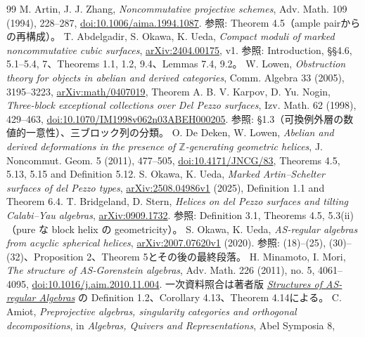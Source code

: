 \documentclass[11pt,a4paper]{ltjsarticle}
\theoremstyle{definition}\newtheorem{remark}[theorem]{注意}
\begin{document}
\begin{thebibliography}{99}
 M. Artin, J. J. Zhang,
\emph{Noncommutative projective schemes},
Adv. Math. 109 (1994), 228--287,
\href{https://doi.org/10.1006/aima.1994.1087}{doi:10.1006/aima.1994.1087}.
参照: Theorem 4.5（ample pairからの再構成）。
 T. Abdelgadir, S. Okawa, K. Ueda,
\emph{Compact moduli of marked noncommutative cubic surfaces},
\href{https://arxiv.org/abs/2404.00175}{arXiv:2404.00175}, v1.
参照: Introduction, \S\S4.6, 5.1--5.4, 7、Theorems 1.1, 1.2, 9.4、Lemmas 7.4, 9.2。
 W. Lowen,
\emph{Obstruction theory for objects in abelian and derived categories},
Comm. Algebra 33 (2005), 3195--3223,
\href{https://arxiv.org/abs/math/0407019}{arXiv:math/0407019}, Theorem A.
 B. V. Karpov, D. Yu. Nogin,
\emph{Three-block exceptional collections over Del Pezzo surfaces},
Izv. Math. 62 (1998), 429--463,
\href{https://doi.org/10.1070/IM1998v062n03ABEH000205}{doi:10.1070/IM1998v062n03ABEH000205}.
参照: \S1.3（可換例外層の数値的一意性）、三ブロック列の分類。
 O. De Deken, W. Lowen,
\emph{Abelian and derived deformations in the presence of $\mathbb Z$-generating geometric helices},
J. Noncommut. Geom. 5 (2011), 477--505,
\href{https://doi.org/10.4171/JNCG/83}{doi:10.4171/JNCG/83},
Theorems 4.5, 5.13, 5.15 and Definition 5.12.
 S. Okawa, K. Ueda,
\emph{Marked Artin--Schelter surfaces of del Pezzo types},
\href{https://arxiv.org/abs/2508.04986}{arXiv:2508.04986v1} (2025),
Definition 1.1 and Theorem 6.4.
 T. Bridgeland, D. Stern,
\emph{Helices on del Pezzo surfaces and tilting Calabi--Yau algebras},
\href{https://arxiv.org/abs/0909.1732}{arXiv:0909.1732}.
参照: Definition 3.1, Theorems 4.5, 5.3(ii)（pure な block helix の geometricity）。
 S. Okawa, K. Ueda,
\emph{AS-regular algebras from acyclic spherical helices},
\href{https://arxiv.org/abs/2007.07620}{arXiv:2007.07620v1} (2020).
参照: (18)--(25), (30)--(32)、Proposition 2、Theorem 5とその後の最終段落。
 H. Minamoto, I. Mori,
\emph{The structure of AS-Gorenstein algebras},
Adv. Math. 226 (2011), no. 5, 4061--4095,
\href{https://doi.org/10.1016/j.aim.2010.11.004}{doi:10.1016/j.aim.2010.11.004}.
一次資料照合は著者版
\href{https://www.math.kyoto-u.ac.jp/preprint/2010/06Minamoto.pdf}{\emph{Structures of AS-regular Algebras}}
の Definition 1.2、Corollary 4.13、Theorem 4.14による。
 C. Amiot,
\emph{Preprojective algebras, singularity categories and orthogonal decompositions},
in \emph{Algebras, Quivers and Representations}, Abel Symposia 8,

\end{thebibliography}
\end{document}
